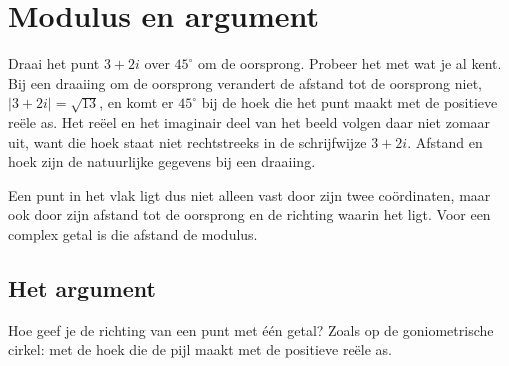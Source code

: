 \begin{oefeningen}[Start]

\end{oefeningen}


\section{Modulus en argument}

Draai het punt $3 + 2i$ over $45^\circ$ om de oorsprong. Probeer het met wat je al kent. Bij een draaiing om de oorsprong verandert de afstand tot de oorsprong niet, $|3 + 2i| = \sqrt{13}$, en komt er $45^\circ$ bij de hoek die het punt maakt met de positieve reële as. Het reëel en het imaginair deel van het beeld volgen daar niet zomaar uit, want die hoek staat niet rechtstreeks in de schrijfwijze $3 + 2i$. Afstand en hoek zijn de natuurlijke gegevens bij een draaiing.

Een punt in het vlak ligt dus niet alleen vast door zijn twee coördinaten, maar ook door zijn afstand tot de oorsprong en de richting waarin het ligt. Voor een complex getal is die afstand de modulus.

\subsection{Het argument}

Hoe geef je de richting van een punt met één getal? Zoals op de goniometrische cirkel: met de hoek die de pijl maakt met de positieve reële as.

